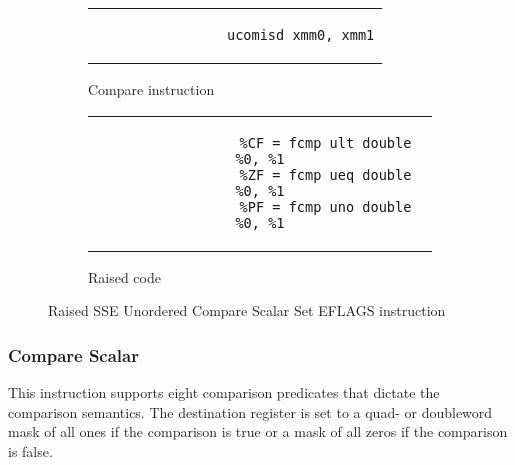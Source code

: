 \begin{figure}[htpb]
    \centering
    \begin{subfigure}{.45\textwidth}
        \begin{tabular}{c}
            \begin{lstlisting}
                ucomisd xmm0, xmm1
            \end{lstlisting}
        \end{tabular}
        \caption{Compare instruction}
    \end{subfigure}
    \begin{subfigure}{.45\textwidth}
        \begin{tabular}{c}
            \begin{lstlisting}
                %CF = fcmp ult double %0, %1
                %ZF = fcmp ueq double %0, %1
                %PF = fcmp uno double %0, %1
            \end{lstlisting}
        \end{tabular}
        \caption{Raised code}
    \end{subfigure}
    \caption[Raised UCOMIS instruction]{Raised SSE Unordered Compare Scalar Set EFLAGS instruction}
    \label{fig:raised-fp-ucomis}
\end{figure}


\subsubsection[CMPS]{Compare Scalar}

This instruction supports eight comparison predicates that dictate the comparison semantics.
The destination register is set to a quad- or doubleword mask of all ones if the comparison is true or a mask of all zeros if the comparison is false.

